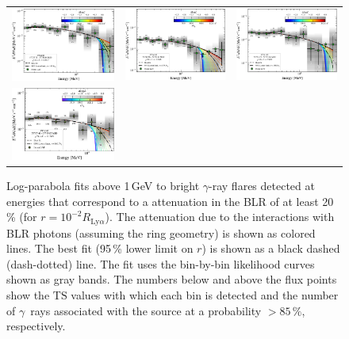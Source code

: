 \documentclass[twocolumn,linenumbers]{aastex62}
\newcommand{\Grays}{$\gamma$~rays\xspace}
\newcommand{\gray}{$\gamma$-ray\xspace}
\begin{document}
\begin{figure}
\begin{tabular}{ccc}
    \includegraphics[width=0.32\linewidth]{sed_CTA102_t002_LogParabola_3min_ring_emin1000.pdf} & 
    \includegraphics[width=0.32\linewidth]{sed_CTA102_t003_LogParabola_3min_ring_emin1000.pdf} & 
    \includegraphics[width=0.32\linewidth]{sed_CTA102_t004_LogParabola_3min_ring_emin1000.pdf}\\
    \includegraphics[width=0.32\linewidth]{sed_CTA102_t001_LogParabola_3min_ring_emin1000.pdf}
    \end{tabular}

    \caption{Log-parabola fits above 1\,GeV to bright \gray flares detected at energies that correspond to a attenuation in the BLR of at least 20\,\% (for $r = 10^{-2}R_{\mathrm{Ly}\alpha}$). The attenuation due to the interactions with BLR photons (assuming the ring geometry) is shown as colored lines. The best fit (95\,\% lower limit on $r$) is shown as a black dashed (dash-dotted) line. 
    The fit uses the bin-by-bin likelihood curves shown as gray bands. The numbers below and above the flux points show the $\mathrm{TS}$ values  with which each bin is detected and the number of \Grays associated with the source at a probability $>85\,\%$, respectively.}
    \label{fig:seds}
\end{figure}
\end{document}
